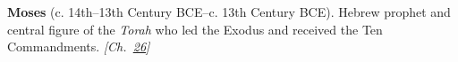 \textbf{Moses} (c. 14th–13th Century BCE–c. 13th Century BCE). Hebrew prophet and central figure of the \emph{Torah} who led the Exodus and received the Ten Commandments. \emph{[Ch.~\hyperref[ch:jewishcalendar]{26}]}

